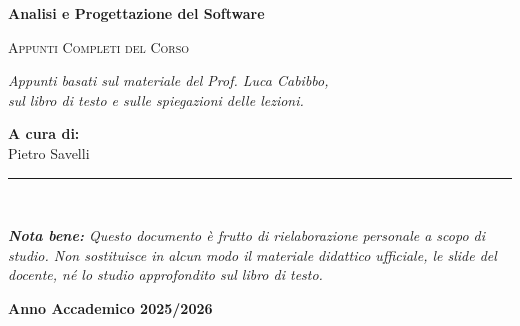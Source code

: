 \documentclass[10pt, a4paper]{article}
\begin{document}
\begin{titlepage}
    \centering
    \vspace*{3cm}
    
    {\huge\bfseries Analisi e Progettazione del Software \par}
    \vspace{1.5cm}
    
    {\Large \textsc{Appunti Completi del Corso} \par}
    \vspace{2.5cm}
    
    {\large \itshape 
    Appunti basati sul materiale del Prof. Luca Cabibbo, \\
    sul libro di testo e sulle spiegazioni delle lezioni. \par}
    \vspace{2cm} %
    
    {\Large \textbf{A cura di:} \\ \vspace{0.2cm} Pietro Savelli \par}
    
    \vfill %
    
    \rule{0.8\textwidth}{0.4pt} \\ %
    \vspace{0.3cm} %
    {\footnotesize \textit{\textbf{Nota bene:} Questo documento è frutto di rielaborazione personale a scopo di studio. Non sostituisce in alcun modo il materiale didattico ufficiale, le slide del docente, né lo studio approfondito sul libro di testo.} \par}
    \vspace{1cm} %
    
    {\large \textbf{Anno Accademico 2025/2026} \par}
    \vspace*{1cm}
\end{titlepage}

\tableofcontents
\newpage

\newpage

\end{document}
